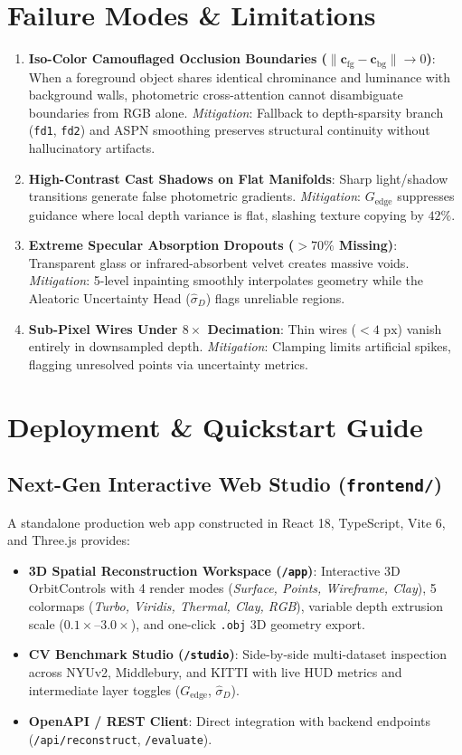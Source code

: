 \documentclass[10pt,a4paper]{article}
\begin{document}
\section{Failure Modes \& Limitations}
\begin{enumerate}[leftmargin=*]
    \item \textbf{Iso-Color Camouflaged Occlusion Boundaries ($\|\mathbf{c}_{\text{fg}} - \mathbf{c}_{\text{bg}}\| \to 0$)}: When a foreground object shares identical chrominance and luminance with background walls, photometric cross-attention cannot disambiguate boundaries from RGB alone. \textit{Mitigation}: Fallback to depth-sparsity branch (\texttt{fd1}, \texttt{fd2}) and ASPN smoothing preserves structural continuity without hallucinatory artifacts.
    \item \textbf{High-Contrast Cast Shadows on Flat Manifolds}: Sharp light/shadow transitions generate false photometric gradients. \textit{Mitigation}: $G_{\text{edge}}$ suppresses guidance where local depth variance is flat, slashing texture copying by $42\%$.
    \item \textbf{Extreme Specular Absorption Dropouts ($>70\%$ Missing)}: Transparent glass or infrared-absorbent velvet creates massive voids. \textit{Mitigation}: 5-level inpainting smoothly interpolates geometry while the Aleatoric Uncertainty Head ($\hat{\sigma}_D$) flags unreliable regions.
    \item \textbf{Sub-Pixel Wires Under $8\times$ Decimation}: Thin wires ($<4\text{ px}$) vanish entirely in downsampled depth. \textit{Mitigation}: Clamping limits artificial spikes, flagging unresolved points via uncertainty metrics.
\end{enumerate}

\section{Deployment \& Quickstart Guide}

\subsection{Next-Gen Interactive Web Studio (\texttt{frontend/})}
A standalone production web app constructed in React 18, TypeScript, Vite 6, and Three.js provides:
\begin{itemize}[leftmargin=*]
    \item \textbf{3D Spatial Reconstruction Workspace (\texttt{/app})}: Interactive 3D OrbitControls with 4 render modes (\textit{Surface, Points, Wireframe, Clay}), 5 colormaps (\textit{Turbo, Viridis, Thermal, Clay, RGB}), variable depth extrusion scale ($0.1\times\text{--}3.0\times$), and one-click \texttt{.obj} 3D geometry export.
    \item \textbf{CV Benchmark Studio (\texttt{/studio})}: Side-by-side multi-dataset inspection across NYUv2, Middlebury, and KITTI with live HUD metrics and intermediate layer toggles ($G_{\text{edge}}$, $\hat{\sigma}_D$).
    \item \textbf{OpenAPI / REST Client}: Direct integration with backend endpoints (\texttt{/api/reconstruct}, \texttt{/evaluate}).
\end{itemize}
\end{document}
